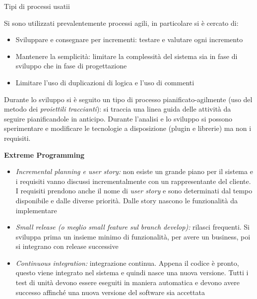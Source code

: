 \documentclass[10pt]{beamer}
\begin{document}
\begin{frame}[allowframebreaks]{Tipi di processi usatii}

Si sono utilizzati prevalentemente processi agili, in particolare si è cercato di:
\begin{itemize}
	
		\item
		Sviluppare e consegnare per incrementi: testare e valutare ogni incremento
		
		\item
		Mantenere la semplicità: limitare la complessità del sistema sia in fase di sviluppo che in fase di progettazione

		\item
		Limitare l’uso di duplicazioni di logica e l'uso di commenti \cite{martin2018clean}
\end{itemize}

Durante lo sviluppo si è seguito un tipo di processo pianificato-agilmente (uso del metodo dei \emph{proiettili traccianti}\cite{hunt2018pragmatic}): si traccia una linea guida delle attività da seguire pianificandole in anticipo. Durante l’analisi e lo sviluppo si possono sperimentare e modificare le tecnologie a disposizione (plugin e librerie) ma non i requisiti.

\framebreak

	\textbf{Extreme Programming}
	
	\begin{itemize}
		\item
		\emph{Incremental planning e user story:} non esiste un grande piano per il sistema e i requisiti vanno discussi incrementalmente con un rappresentante del cliente. I requisiti prendono anche il nome di \emph{user story} e sono determinati dal tempo disponibile e dalle diverse priorità. Dalle story nascono le funzionalità da implementare

		\item
		\emph{Small release (o meglio small feature sul branch develop):} rilasci frequenti. Si sviluppa prima un insieme minimo di funzionalità, per avere un business, poi si integrano con release successive

		\item
		\emph{Continuous integration:} integrazione continua. Appena il codice è pronto, questo viene integrato nel sistema e quindi nasce una nuova versione. Tutti i test di unità devono essere eseguiti in maniera automatica e devono avere successo affinché una nuova versione del software sia accettata


\end{itemize}
\end{frame}
\end{document}
